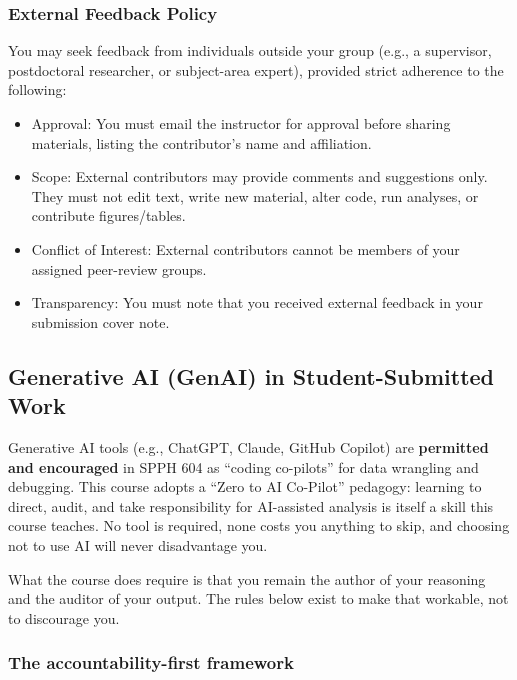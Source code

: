 \documentclass[
]{article}
\newcounter{none} %
\providecommand{\tightlist}{%
  \setlength{\itemsep}{0pt}\setlength{\parskip}{0pt}}
\begin{document}
\subsubsection{External Feedback Policy}\label{external-feedback-policy}

You may seek feedback from individuals outside your group (e.g., a
supervisor, postdoctoral researcher, or subject-area expert), provided
strict adherence to the following:

\begin{itemize}
\tightlist
\item
  Approval: You must email the instructor for approval before sharing
  materials, listing the contributor's name and affiliation.
\item
  Scope: External contributors may provide comments and suggestions
  only. They must not edit text, write new material, alter code, run
  analyses, or contribute figures/tables.
\item
  Conflict of Interest: External contributors cannot be members of your
  assigned peer-review groups.
\item
  Transparency: You must note that you received external feedback in
  your submission cover note.
\end{itemize}

\subsection{Generative AI (GenAI) in Student-Submitted
Work}\label{generative-ai-genai-in-student-submitted-work}

Generative AI tools (e.g., ChatGPT, Claude, GitHub Copilot) are
\textbf{permitted and encouraged} in SPPH 604 as ``coding co-pilots''
for data wrangling and debugging. This course adopts a ``Zero to AI
Co-Pilot'' pedagogy: learning to direct, audit, and take responsibility
for AI-assisted analysis is itself a skill this course teaches. No tool
is required, none costs you anything to skip, and choosing not to use AI
will never disadvantage you.

What the course does require is that you remain the author of your
reasoning and the auditor of your output. The rules below exist to make
that workable, not to discourage you.

\subsubsection{The accountability-first
framework}\label{the-accountability-first-framework}
\end{document}
